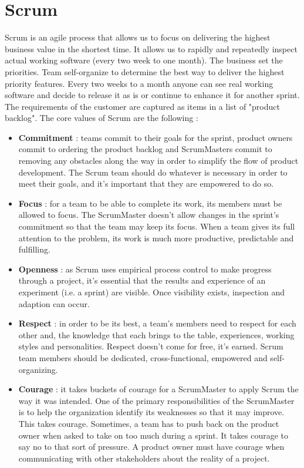 \documentclass[11pt]{article}
\begin{document}
\section{Scrum}
Scrum is an agile process that allows us to focus on delivering the highest business value in the shortest time. It allows us to rapidly and repeatedly inspect actual working software (every two week to one month). The business set the priorities. Team self-organize to determine the best way to deliver the highest priority features. Every two weeks to a month anyone can see real working software and decide to release it as is or continue to enhance it for another sprint. The requirements of the customer are captured as items in a list of "product backlog". The core values of Scrum are the following :
\begin{itemize}
\item \textbf{Commitment} : teams commit to their goals for the sprint, product owners commit to ordering the product backlog and ScrumMasters commit to removing any obstacles along the way in order to simplify the flow of product development. The Scrum team should do whatever is necessary in order to meet their goals, and it's important that they are empowered to do so.
\item \textbf{Focus} : for a team to be able to complete its work, its members must be allowed to focus. The ScrumMaster doesn't allow changes in the sprint's commitment so that the team may keep its focus. When a team gives its full attention to the problem, its work is much more productive, predictable and fulfilling.
\item \textbf{Openness} : as Scrum uses empirical process control to make progress through a project, it's essential that the results and experience of an experiment (i.e. a sprint) are visible. Once visibility exists, inspection and adaption can occur.
\item \textbf{Respect} : in order to be its best, a team's members need to respect for each other and, the knowledge that each brings to the table, experiences, working styles and personalities. Respect doesn't come for free, it's earned. Scrum team members should be dedicated, cross-functional, empowered and self-organizing.
\item \textbf{Courage} : it takes buckets of courage for a ScrumMaster to apply Scrum the way it was intended. One of the primary responsibilities of the ScrumMaster is to help the organization identify its weaknesses so that it may improve. This takes courage. Sometimes, a team has to push back on the product owner when asked to take on too much during a sprint. It takes courage to say no to that sort of pressure. A product owner must have courage when communicating with other stakeholders about the reality of a project. 
\end{itemize}
\end{document}

